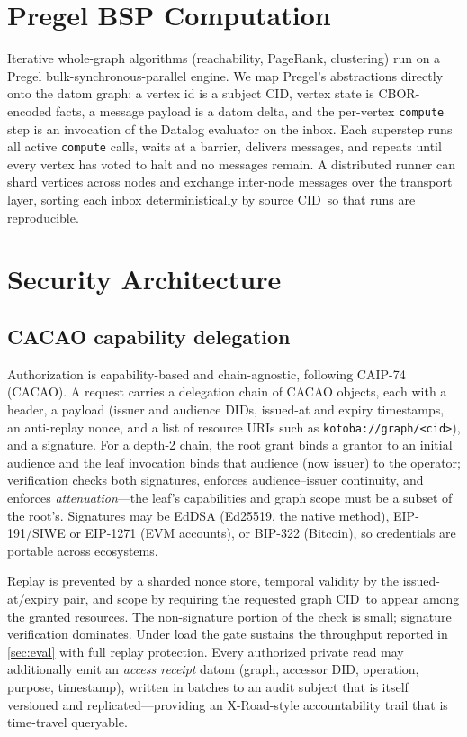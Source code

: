 \documentclass[11pt]{article}
\newcommand{\cid}{\textsf{CID}}
\begin{document}
\section{Pregel BSP Computation}
\label{sec:pregel}

Iterative whole-graph algorithms (reachability, PageRank, clustering) run on a
Pregel bulk-synchronous-parallel engine. We map Pregel's abstractions directly
onto the datom graph: a vertex id is a subject \cid, vertex state is CBOR-encoded
facts, a message payload is a datom delta, and the per-vertex \texttt{compute}
step is an invocation of the Datalog evaluator on the inbox. Each
superstep runs all active \texttt{compute} calls, waits at a barrier, delivers
messages, and repeats until every vertex has voted to halt and no messages remain.
A distributed runner can shard vertices across nodes and exchange inter-node
messages over the transport layer, sorting each inbox deterministically by source
\cid\ so that runs are reproducible.

\section{Security Architecture}
\label{sec:security}

\subsection{CACAO capability delegation}
\label{sec:cacao}
Authorization is capability-based and chain-agnostic, following CAIP-74 (CACAO).
A request carries a delegation chain of CACAO objects, each with a header,
a payload (issuer and audience DIDs, issued-at and expiry timestamps, an
anti-replay nonce, and a list of resource URIs such as
\texttt{kotoba://graph/<cid>}), and a signature. For a depth-2 chain, the root
grant binds a grantor to an initial audience and the leaf invocation binds that
audience (now issuer) to the operator; verification checks both signatures,
enforces audience--issuer continuity, and enforces \emph{attenuation}---the leaf's
capabilities and graph scope must be a subset of the root's. Signatures may be
EdDSA (Ed25519, the native method), EIP-191/SIWE or EIP-1271 (EVM accounts), or
BIP-322 (Bitcoin), so credentials are portable across ecosystems.

Replay is prevented by a sharded nonce store, temporal validity by the
issued-at/expiry pair, and scope by requiring the requested graph \cid\ to appear
among the granted resources. The non-signature portion of the check is small;
signature verification dominates. Under load the gate sustains the throughput
reported in \cref{sec:eval} with full replay protection. Every
authorized private read may additionally emit an \emph{access receipt} datom
(graph, accessor DID, operation, purpose, timestamp), written in batches to an
audit subject that is itself versioned and replicated---providing an
X-Road-style accountability trail that is time-travel queryable.
\end{document}

